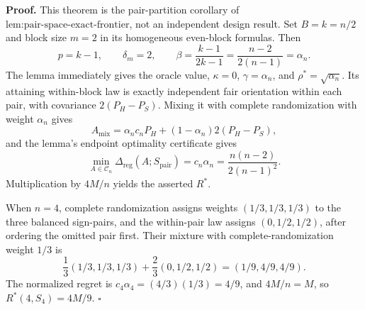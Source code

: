 \textbf{Proof.}
This theorem is the pair-partition corollary of \(\text{lem:pair-space-exact-frontier}\), not an independent design result.  Set \(B=k=n/2\) and block size \(m=2\) in its homogeneous even-block formulas.  Then
\[
p=k-1,
\qquad
\delta_m=2,
\qquad
\beta=\frac{k-1}{2k-1}=\frac{n-2}{2(n-1)}=\alpha_n.
\]
The lemma immediately gives the oracle value, \(\kappa=0\), \(\gamma=\alpha_n\), and \(\rho^*=\sqrt{\alpha_n}\).  Its attaining within-block law is exactly independent fair orientation within each pair, with covariance \(2(P_H-P_S)\).  Mixing it with complete randomization with weight \(\alpha_n\) gives
\[
A_{\mathrm{mix}}=\alpha_nc_nP_H+(1-\alpha_n)2(P_H-P_S),
\]
and the lemma's endpoint optimality certificate gives
\[
\min_{A\in\mathcal C_n}\Delta_{\mathrm{reg}}(A;S_{\mathrm{pair}})
=c_n\alpha_n
=\frac{n(n-2)}{2(n-1)^2}.
\]
Multiplication by \(4M/n\) yields the asserted \(R^*\).

When \(n=4\), complete randomization assigns weights \((1/3,1/3,1/3)\) to the three balanced sign-pairs, and the within-pair law assigns \((0,1/2,1/2)\), after ordering the omitted pair first.  Their mixture with complete-randomization weight \(1/3\) is
\[
\frac13(1/3,1/3,1/3)+\frac23(0,1/2,1/2)
=(1/9,4/9,4/9).
\]
The normalized regret is \(c_4\alpha_4=(4/3)(1/3)=4/9\), and \(4M/n=M\), so \(R^*(4,S_4)=4M/9\). \(\square\)